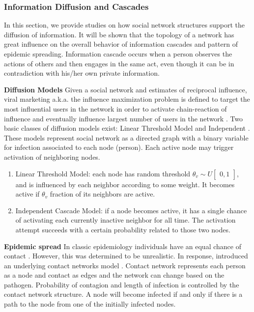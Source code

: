 \documentclass[11pt,a4paper]{article}
\begin{document}
\subsubsection{Information Diffusion and Cascades}
In this section, we provide studies on how social network structures support the diffusion of information. It will be shown that the topology of a network has great influence on the overall behavior of information cascades and pattern of epidemic spreading. Information cascade occurs when a person observes the actions of others and then  engages in the same act, even though it can be in contradiction with his/her own private information. %

\textbf{Diffusion Models} Given a social network and estimates of reciprocal influence, viral marketing a.k.a. the influence maximization problem is defined to target the most influential users in the network in order to activate chain-reaction of influence and eventually influence largest number of users in the network \cite{richardson}. Two basic classes of diffusion models exist: Linear Threshold Model and Independent . These models represent social network as a directed graph with a binary variable for infection associated to each node (person). Each active node may trigger activation of neighboring nodes. 
\begin{enumerate}
\item Linear Threshold Model: each node has random threshold $\theta_{v} \sim  U\begin{bmatrix} 0, 1 \end{bmatrix}$, and is influenced by each neighbor according to some weight. It becomes active if $\theta_{v}$ fraction of its neighbors are active.
\item Independent Cascade Model: if a node becomes active, it has a single chance of activating each currently inactive neighbor for all time. The activation attempt succeeds with a certain probability related to those two nodes.
\end{enumerate}

\textbf{Epidemic spread} In classic epidemiology individuals have an equal chance of contact . However, this was determined to be unrealistic. In response,\citet{newman} introduced an underlying contact networks model \cite{newman}. Contact network represents each person as a node and contact as edges and the network can change based on the pathogen. Probability of contagion and length of infection is controlled by the contact network structure. A node will become infected if and only if there is a path to the node from one of the initially infected nodes. \cite{pastor}
\end{document}
